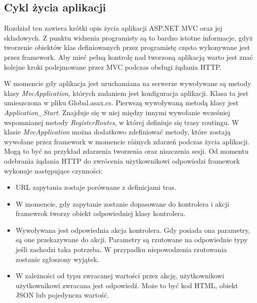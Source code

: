 \subsection{Cykl życia aplikacji}
Rozdział ten zawiera krótki opis życia aplikacji ASP.NET MVC oraz jej składowych. Z punktu widzenia programisty są to bardzo istotne informacje, gdyż tworzenie obiektów klas definiowanych przez programistę często wykonywane jest przez framework. Aby mieć pełną kontrolę nad tworzoną aplikacją warto jest znać kolejne kroki podejmowane przez MVC podczas obsługi żądania HTTP.

W momencie gdy aplikacja jest uruchamiana na serwerze wywoływane są metody klasy \textit{MvcApplication}, których zadaniem jest konfiguracja aplikacji. Klasa ta jest umieszczona w pliku Global.asax.cs. Pierwszą wywoływaną metodą klasy jest \textit{Application\_Start}. Znajduje się w niej między innymi wywołanie wcześniej wspomnianej metody \textit{RegisterRoutes}, w której definiuje się trasy routingu. W klasie \textit{MvcApplication} można dodatkowo zdefiniować metody, które zostają wywołane przez framework w momencie różnych zdarzeń podczas życia aplikacji. Mogą to być na przykład zdarzenia tworzenia oraz niszczenia sesji.
Od momentu odebrania żądania HTTP do zwrócenia użytkownikowi odpowiedzi framework wykonuje następujące czynności:
\begin{itemize}
\item URL zapytania zostaje porównane z definicjami tras.
\item W momencie, gdy zapytanie zostanie dopasowane do kontrolera i akcji framewrok tworzy obiekt odpowiedniej klasy kontrolera. 
\item Wywoływana jest odpowiednia akcja kontrolera. Gdy posiada ona parametry, są one przekazywane do akcji. Parametry są rzutowane na odpowiednie typy jeśli zachodzi taka potrzeba. W przypadku niepowodzenia rzutowania zostanie zgłoszony wyjątek.
\item W zależności od typu zwracanej wartości przez akcję, użytkownikowi użytkownikowi zwracana jest odpowiedź. Może to być kod HTML, obiekt JSON lub pojedyncza wartość.
\end{itemize}

